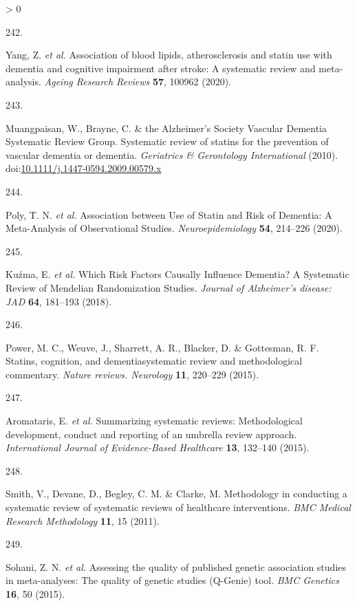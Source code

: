 \documentclass[a4paper, twoside]{templates/ociamthesis}
\newlength{\cslhangindent}
\newlength{\csllabelwidth}
\newenvironment{CSLReferences}[3] %
 {%
  \setlength{\parindent}{0pt}
  \ifodd #1 \everypar{\setlength{\hangindent}{\cslhangindent}}\ignorespaces\fi
  \ifnum #2 > 0
  \setlength{\parskip}{#2\baselineskip}
  \fi
 }%
 {}
\newcommand{\CSLLeftMargin}[1]{\parbox[t]{\maxof{\widthof{#1}}{\csllabelwidth}}{#1}}
\newcommand{\CSLRightInline}[1]{\parbox[t]{\linewidth - \csllabelwidth}{#1}}
\begin{document}
\begin{CSLReferences}{0}{0}
\leavevmode\hypertarget{ref-yang2020}{}%
\CSLLeftMargin{242. }
\CSLRightInline{Yang, Z. \emph{et al.} Association of blood lipids, atherosclerosis and statin use with dementia and cognitive impairment after stroke: A systematic review and meta-analysis. \emph{Ageing Research Reviews} \textbf{57}, 100962 (2020).}

\leavevmode\hypertarget{ref-muangpaisan2010}{}%
\CSLLeftMargin{243. }
\CSLRightInline{Muangpaisan, W., Brayne, C. \& the Alzheimer's Society Vascular Dementia Systematic Review Group. Systematic review of statins for the prevention of vascular dementia or dementia. \emph{Geriatrics \& Gerontology International} (2010). doi:\href{https://doi.org/10.1111/j.1447-0594.2009.00579.x}{10.1111/j.1447-0594.2009.00579.x}}

\leavevmode\hypertarget{ref-poly2020}{}%
\CSLLeftMargin{244. }
\CSLRightInline{Poly, T. N. \emph{et al.} Association between {Use} of {Statin} and {Risk} of {Dementia}: A {Meta}-{Analysis} of {Observational Studies}. \emph{Neuroepidemiology} \textbf{54}, 214--226 (2020).}

\leavevmode\hypertarget{ref-kuzma2018a}{}%
\CSLLeftMargin{245. }
\CSLRightInline{Kuźma, E. \emph{et al.} Which {Risk Factors Causally Influence Dementia}? A {Systematic Review} of {Mendelian Randomization Studies}. \emph{Journal of Alzheimer's disease: JAD} \textbf{64}, 181--193 (2018).}

\leavevmode\hypertarget{ref-power2015}{}%
\CSLLeftMargin{246. }
\CSLRightInline{Power, M. C., Weuve, J., Sharrett, A. R., Blacker, D. \& Gottesman, R. F. Statins, cognition, and dementia{}systematic review and methodological commentary. \emph{Nature reviews. Neurology} \textbf{11}, 220--229 (2015).}

\leavevmode\hypertarget{ref-aromataris2015}{}%
\CSLLeftMargin{247. }
\CSLRightInline{Aromataris, E. \emph{et al.} Summarizing systematic reviews: Methodological development, conduct and reporting of an umbrella review approach. \emph{International Journal of Evidence-Based Healthcare} \textbf{13}, 132--140 (2015).}

\leavevmode\hypertarget{ref-smith2011}{}%
\CSLLeftMargin{248. }
\CSLRightInline{Smith, V., Devane, D., Begley, C. M. \& Clarke, M. Methodology in conducting a systematic review of systematic reviews of healthcare interventions. \emph{BMC Medical Research Methodology} \textbf{11}, 15 (2011).}

\leavevmode\hypertarget{ref-sohani2015}{}%
\CSLLeftMargin{249. }
\CSLRightInline{Sohani, Z. N. \emph{et al.} Assessing the quality of published genetic association studies in meta-analyses: The quality of genetic studies ({Q}-{Genie}) tool. \emph{BMC Genetics} \textbf{16}, 50 (2015).}


\end{CSLReferences}
\end{document}
